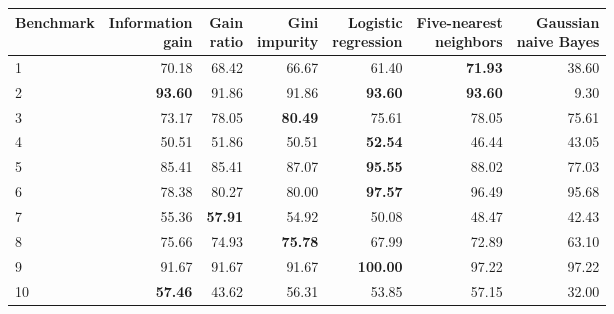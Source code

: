 \begin{tabular}{@{}lrrrrrr@{}}
\toprule
Benchmark & \shortstack{Information\\gain} & \shortstack{Gain\\ratio} & \shortstack{Gini\\impurity} & \shortstack{Logistic\\regression} & \shortstack{Five-nearest\\neighbors} & \shortstack{Gaussian\\naive Bayes} \\
\midrule
1 & 70.18 & 68.42 & 66.67 & 61.40 & \textbf{71.93} & 38.60 \\
2 & \textbf{93.60} & 91.86 & 91.86 & \textbf{93.60} & \textbf{93.60} & 9.30 \\
3 & 73.17 & 78.05 & \textbf{80.49} & 75.61 & 78.05 & 75.61 \\
4 & 50.51 & 51.86 & 50.51 & \textbf{52.54} & 46.44 & 43.05 \\
5 & 85.41 & 85.41 & 87.07 & \textbf{95.55} & 88.02 & 77.03 \\
6 & 78.38 & 80.27 & 80.00 & \textbf{97.57} & 96.49 & 95.68 \\
7 & 55.36 & \textbf{57.91} & 54.92 & 50.08 & 48.47 & 42.43 \\
8 & 75.66 & 74.93 & \textbf{75.78} & 67.99 & 72.89 & 63.10 \\
9 & 91.67 & 91.67 & 91.67 & \textbf{100.00} & 97.22 & 97.22 \\
10 & \textbf{57.46} & 43.62 & 56.31 & 53.85 & 57.15 & 32.00 \\
\bottomrule
\end{tabular}
